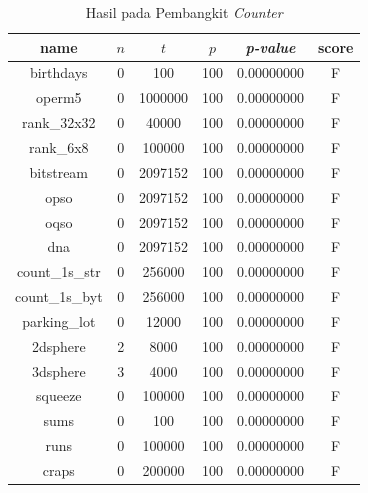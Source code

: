 \documentclass[conference]{IEEEtran}
\newcommand{\en}[1]
    {\foreignlanguage{english}{\textit{#1}}}
\begin{document}
\begin{table}[htbp]
    \caption{Hasil  pada Pembangkit \en{Counter}}
    \label{tab:analisis:res-counter}
    \begin{center}
        \begin{tabular}{|c|c|c|c|c|c|}
            \hline
            \textbf{name}  & \textbf{$n$} & \textbf{$t$} & \textbf{$p$} & \textbf{\en{p-value}} & \textbf{score} \\
            \hline
            birthdays      & 0            & 100          & 100          & 0.00000000            & F              \\
            operm5         & 0            & 1000000      & 100          & 0.00000000            & F              \\
            rank\_32x32    & 0            & 40000        & 100          & 0.00000000            & F              \\
            rank\_6x8      & 0            & 100000       & 100          & 0.00000000            & F              \\
            bitstream      & 0            & 2097152      & 100          & 0.00000000            & F              \\
            opso           & 0            & 2097152      & 100          & 0.00000000            & F              \\
            oqso           & 0            & 2097152      & 100          & 0.00000000            & F              \\
            dna            & 0            & 2097152      & 100          & 0.00000000            & F              \\
            count\_1s\_str & 0            & 256000       & 100          & 0.00000000            & F              \\
            count\_1s\_byt & 0            & 256000       & 100          & 0.00000000            & F              \\
            parking\_lot   & 0            & 12000        & 100          & 0.00000000            & F              \\
            2dsphere       & 2            & 8000         & 100          & 0.00000000            & F              \\
            3dsphere       & 3            & 4000         & 100          & 0.00000000            & F              \\
            squeeze        & 0            & 100000       & 100          & 0.00000000            & F              \\
            sums           & 0            & 100          & 100          & 0.00000000            & F              \\
            runs           & 0            & 100000       & 100          & 0.00000000            & F              \\
            craps          & 0            & 200000       & 100          & 0.00000000            & F              \\
            \hline
        \end{tabular}
    \end{center}
\end{table}
\end{document}
